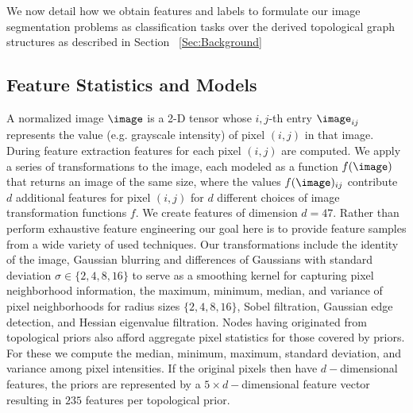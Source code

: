 \vspace{-0.1cm}
We now detail how we obtain features and labels to formulate our image segmentation problems as classification tasks over the derived topological graph structures as described in Section ~\ref{Sec:Background}

\vspace{-0.1cm}
\subsection{Feature Statistics and Models}
\label{ssec:models}
A normalized image $\image$ is a 2-D tensor whose $i,j$-th entry $\image_{ij}$ represents the value (e.g. grayscale intensity) of pixel $(i,j)$ in that image.  During feature extraction features for each pixel $(i,j)$ are computed. We apply a series of transformations to the image, each modeled as a function $f(\image)$ that returns an image of the same size, where the values $f(\image)_{ij}$ contribute $d$ additional features for pixel $(i,j)$ for $d$ different choices of image transformation functions $f$. We create features of dimension $d = 47$.  Rather than perform exhaustive feature engineering our goal here is to provide feature samples from a wide variety of used techniques. Our transformations include the identity of the image, Gaussian blurring and differences of Gaussians with standard deviation $\sigma \in \{2,4,8,16\}$ to serve as a smoothing kernel for capturing pixel neighborhood information, the maximum, minimum, median, and variance of pixel neighborhoods for radius sizes $\{2,4,8,16\}$, Sobel filtration, Gaussian edge detection, and Hessian eigenvalue filtration.
 Nodes having originated from topological priors also afford aggregate pixel statistics for those covered by priors. For these we compute the median, minimum, maximum, standard deviation, and variance among pixel intensities. If the original pixels then have $d-$dimensional features, the priors are represented by a $5 \times d-$dimensional feature vector resulting in $235$ features per topological prior. 


